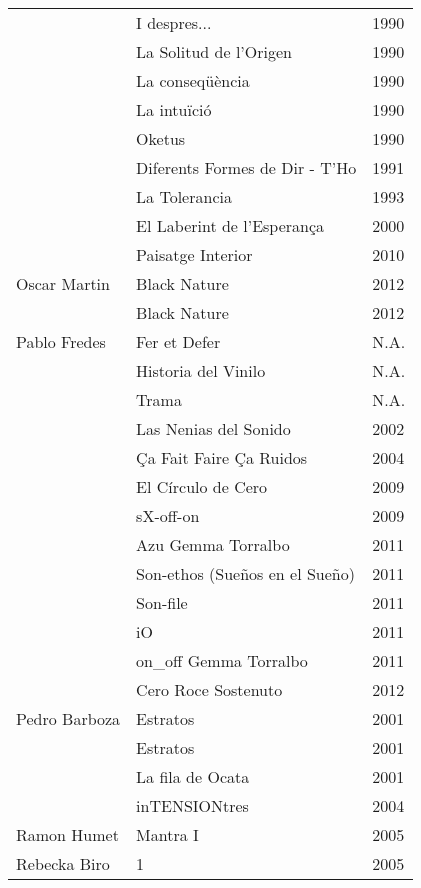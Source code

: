 \begin{center}
\begin{longtable}{ p{}  p{}  p{} }
& I despres... & 1990 \\ \cmidrule (r){2-3} 
& La Solitud de l'Origen & 1990 \\ \cmidrule (r){2-3} 
& La conseqüència & 1990 \\ \cmidrule (r){2-3} 
& La intuïció & 1990 \\ \cmidrule (r){2-3} 
& Oketus & 1990 \\ \cmidrule (r){2-3} 
& Diferents Formes de Dir - T'Ho & 1991 \\ \cmidrule (r){2-3} 
& La Tolerancia & 1993 \\ \cmidrule (r){2-3} 
& El Laberint de l'Esperança & 2000 \\ \cmidrule (r){2-3} 
& Paisatge Interior & 2010 \\ \midrule 
Oscar Martin & Black Nature & 2012 \\ \cmidrule (r){2-3} 
& Black Nature & 2012 \\ \midrule 
Pablo Fredes & Fer et Defer & N.A. \\ \cmidrule (r){2-3} 
& Historia del Vinilo & N.A. \\ \cmidrule (r){2-3} 
& Trama & N.A. \\ \cmidrule (r){2-3} 
& Las Nenias del Sonido & 2002 \\ \cmidrule (r){2-3} 
& Ça Fait Faire Ça Ruidos & 2004 \\ \cmidrule (r){2-3} 
& El Círculo de Cero & 2009 \\ \cmidrule (r){2-3} 
& sX-off-on & 2009 \\ \cmidrule (r){2-3} 
& Azu Gemma Torralbo & 2011 \\ \cmidrule (r){2-3} 
& Son-ethos (Sueños en el Sueño) & 2011 \\ \cmidrule (r){2-3} 
& Son-file & 2011 \\ \cmidrule (r){2-3} 
& iO & 2011 \\ \cmidrule (r){2-3} 
& on\_off Gemma Torralbo & 2011 \\ \cmidrule (r){2-3} 
& Cero Roce Sostenuto & 2012 \\ \midrule 
Pedro Barboza & Estratos & 2001 \\ \cmidrule (r){2-3} 
& Estratos & 2001 \\ \cmidrule (r){2-3} 
& La fila de Ocata & 2001 \\ \cmidrule (r){2-3} 
& inTENSIONtres & 2004 \\ \midrule 
Ramon Humet & Mantra I & 2005 \\ \midrule 
Rebecka Biro & 1 & 2005 \\ \cmidrule (r){2-3} 

\end{longtable}
\end{center}
